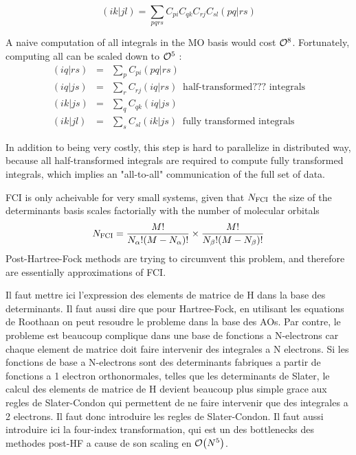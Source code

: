 \documentclass[./thesis.tex]{subfiles}
\begin{document}
\begin{equation}
(ik|jl) = \sum_{pqrs} C_{pi} C_{qk} C_{rj} C_{sl} (pq|rs)
\end{equation}

A naive computation of all integrals in the MO basis would cost ${\cal O}^8$. Fortunately, computing all can be scaled down to ${\cal O}^5$ \cite{Bender_1972} :
\begin{eqnarray}
(iq\vert rs) & = & \sum_{p} C_{pi} (pq|rs) \nonumber \\ 
(iq\vert js) & = & \sum_{r} C_{rj} (iq|rs) \;\; \text{half-transformed??? integrals} \\
(ik\vert js) & = & \sum_{q} C_{qk} (iq|js) \nonumber \\ 
(ik\vert jl) & = & \sum_{s} C_{sl} (ik|js)  \;\; \text{fully transformed integrals}
\end{eqnarray}

In addition to being very costly, this step is hard to parallelize in distributed way, because all half-transformed integrals are required to compute fully transformed integrals, which implies an "all-to-all" communication of the full set of data.

FCI is only acheivable for very small systems, given that $N_\text{FCI}$ the size of the determinants basis scales factorially with the number of molecular orbitals
\begin{equation}
N_\text{FCI} = \frac{M!}{N_\alpha ! (M-N_\alpha)!} \times \frac{M!}{N_\beta ! (M-N_\beta)!}
\end{equation}
Post-Hartree-Fock methods are trying to circumvent this problem, and therefore are essentially approximations of FCI.




\alert{ Il faut mettre ici l'expression des elements de matrice de H dans la
base des determinants.  Il faut aussi dire que pour Hartree-Fock, en utilisant
les equations de Roothaan on peut resoudre le probleme dans la base des AOs.
Par contre, le probleme est beaucoup complique dans une base de fonctions a
N-electrons car chaque element de matrice doit faire intervenir des integrales
a N electrons.  Si les fonctions de base a N-electrons sont des determinants
fabriques a partir de fonctions a 1 electron orthonormales, telles que les
determinants de Slater, le calcul des elements de matrice de H devient beaucoup
plus simple grace aux regles de Slater-Condon qui permettent de ne faire
intervenir que des integrales a 2 electrons. Il faut donc introduire les regles
de Slater-Condon.  Il faut aussi introduire ici la four-index transformation,
qui est un des bottlenecks des methodes post-HF a cause de son scaling en
$\order{N^5}$.  } 
\end{document}
